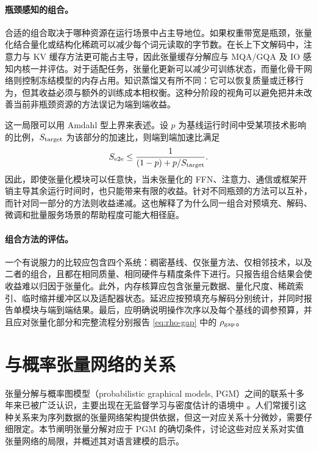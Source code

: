 \paragraph{瓶颈感知的组合。}
合适的组合取决于哪种资源在运行场景中占主导地位。如果权重带宽是瓶颈，张量化结合量化或结构化稀疏可以减少每个词元读取的字节数。在长上下文解码中，注意力与 KV 缓存方法更可能占主导，因此张量缓存分解应与 MQA/GQA 及 IO 感知内核一并评估。对于适配任务，张量化更新可以减少可训练状态，而量化骨干网络则控制冻结模型的内存占用。知识蒸馏又有所不同：它可以恢复质量或迁移行为，但其收益必须与额外的训练成本相权衡。这种分阶段的视角可以避免把并未改善当前非瓶颈资源的方法误记为端到端收益。

这一局限可以用 Amdahl 型上界来表述。设 $p$ 为基线运行时间中受某项技术影响的比例，$S_{\rm target}$ 为该部分的加速比，则端到端加速比满足
\begin{equation}
S_{\rm e2e} \leq \frac{1}{(1-p)+p/S_{\rm target}}.
\label{eq:neighboring-amdahl}
\end{equation}
因此，即使张量化模块可以任意快，当未张量化的 FFN、注意力、通信或框架开销主导其余运行时间时，也只能带来有限的收益。针对不同瓶颈的方法可以互补，而针对同一部分的方法则收益递减。这也解释了为什么同一组合对预填充、解码、微调和批量服务场景的帮助程度可能大相径庭。

\paragraph{组合方法的评估。}
一个有说服力的比较应包含四个系统：稠密基线、仅张量方法、仅相邻技术，以及二者的组合，且都在相同质量、相同硬件与精度条件下进行。只报告组合结果会使收益难以归因于张量化。此外，内存核算应包含张量元数据、量化尺度、稀疏索引、临时缩并缓冲区以及适配器状态。延迟应按预填充与解码分别统计，并同时报告单模块与端到端结果。最后，应明确说明操作次序以及每个基线的调参预算，并且应对张量化部分和完整流程分别报告 \cref{eq:rho-gap} 中的 $\rho_{\rm gap}$。

\section{与概率张量网络的关系}
\label{sec:prob-tensor-nets}
张量分解与概率图模型（probabilistic graphical models, PGM）之间的联系十多年来已被广泛认识，主要出现在无监督学习与密度估计的语境中 \cite{hameed2025efficient,han2018unsupervised,miller2021tensor,vieijra2022generative,glasser2019expressive}。人们常援引这种关系来为序列数据的张量网络架构提供依据，但这一对应关系十分微妙，需要仔细限定。本节阐明张量分解对应于 PGM 的确切条件，讨论这些对应关系对实值张量网络的局限，并概述其对语言建模的启示。

